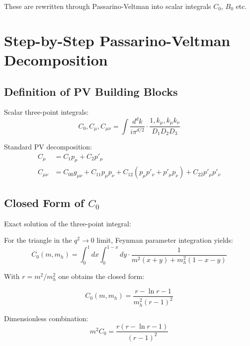 \documentclass[12pt,a4paper]{report}
\begin{document}
	These are rewritten through Passarino-Veltman into scalar integrals $C_0$, $B_0$ etc.
	
	\section{Step-by-Step Passarino-Veltman Decomposition}
	
	\subsection{Definition of PV Building Blocks}
	
	\begin{pvbox}
		Scalar three-point integrals:
		\begin{equation}
			C_0, C_\mu, C_{\mu\nu} = \int \frac{d^d k}{i\pi^{d/2}} \cdot \frac{1, k_\mu, k_\mu k_\nu}{D_1 D_2 D_3}
		\end{equation}
		
		Standard PV decomposition:
		\begin{align}
			C_\mu &= C_1 p_\mu + C_2 p'_\mu\\
			C_{\mu\nu} &= C_{00} g_{\mu\nu} + C_{11} p_\mu p_\nu + C_{12}(p_\mu p'_\nu + p'_\mu p_\nu) + C_{22} p'_\mu p'_\nu
		\end{align}
	\end{pvbox}
	
	\subsection{Closed Form of $C_0$}
	
	\begin{pvbox}
		Exact solution of the three-point integral:
		
		For the triangle in the $q^2 \to 0$ limit, Feynman parameter integration yields:
		\begin{equation}
			C_0(m, m_h) = \int_0^1 dx \int_0^{1-x} dy \cdot \frac{1}{m^2(x+y) + m_h^2(1-x-y)}
		\end{equation}
		
		With $r = m^2/m_h^2$ one obtains the closed form:
		
		\begin{equation}
			C_0(m, m_h) = \frac{r - \ln r - 1}{m_h^2(r-1)^2}
		\end{equation}
		
		Dimensionless combination:
		\begin{equation}
			m^2C_0 = \frac{r(r - \ln r - 1)}{(r-1)^2}
		\end{equation}
	\end{pvbox}
	
\end{document}
